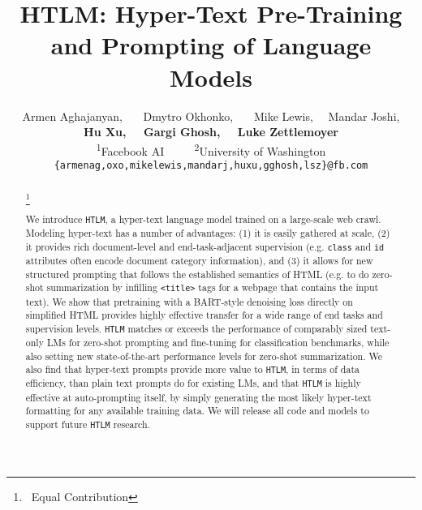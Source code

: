 \documentclass[11pt,a4paper]{article}
\title{HTLM: Hyper-Text Pre-Training and Prompting of Language Models}
\author{Armen Aghajanyan\affilsup{1},~\textsuperscript{} ~~Dmytro Okhonko\affilsup{1},~\textsuperscript{} 
~~Mike Lewis\affilsup{1}, ~~Mandar Joshi\affilsup{1,2}, \\
\textbf{Hu Xu\affilsup{1}, ~~Gargi Ghosh\affilsup{1}, ~~Luke Zettlemoyer\affilsup{1,2}} \\
\textsuperscript{1}Facebook AI ~~~~
\textsuperscript{2}University of Washington \\
  \texttt{\{armenag,oxo,mikelewis,mandarj,huxu,gghosh,lsz\}@fb.com} 
  }
\date{}
\newcommand{\HTLM}{\texttt{HTLM}}
\newcommand\blfootnote[1]{\begingroup
  \renewcommand\thefootnote{}\footnote{#1}\addtocounter{footnote}{-1}\endgroup
}
\begin{document}
\maketitle
\begin{abstract}
\blfootnote{\textsuperscript{}~Equal Contribution}






We introduce \HTLM{}, a hyper-text language model trained on a large-scale web crawl. 
Modeling hyper-text has a number of advantages: (1) it is easily gathered at scale, (2) it provides rich document-level and end-task-adjacent supervision (e.g. \verb+class+ and \verb+id+ attributes often encode document category information), and (3) it allows for new structured prompting that follows the established semantics of HTML (e.g. to do zero-shot summarization by infilling \verb+<title>+ tags for a webpage that contains the input text). 
We show that pretraining with a BART-style denoising loss directly on simplified HTML provides highly effective transfer for a wide range of end tasks and supervision levels. 
\HTLM{} matches or exceeds the performance of comparably sized text-only LMs for zero-shot prompting and fine-tuning for classification benchmarks, while also setting new state-of-the-art performance levels for zero-shot summarization. 
We also find that hyper-text prompts provide more value to \HTLM{}, in terms of data efficiency, than plain text prompts do for existing LMs, and that \HTLM{} is highly effective at auto-prompting itself, by simply generating the most likely hyper-text formatting for any available training data.
We will release all code and models to support future \HTLM{} research. 
\end{abstract}
\end{document}
